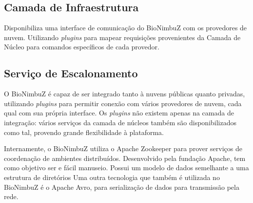 \begin{itemize}
	\end{itemize}
	
	\subsection{Camada de Infraestrutura} Disponibiliza uma interface de comunicação do BioNimbuZ com os provedores de nuvem. Utilizando \textit{plugins} para mapear requisições provenientes da Camada de Núcleo para comandos específicos de cada provedor.

\subsection{Serviço de Escalonamento}

O BioNimbuZ é capaz de ser integrado tanto à nuvens públicas quanto privadas, utilizando \textit{plugins} para permitir conexão com vários provedores de nuvem, cada qual com sua própria interface. Os \textit{plugins} não existem apenas na camada de integração: vários serviços da camada de núcleos também são disponibilizados como tal, provendo grande flexibilidade à plataforma.

Internamente, o BioNimbuZ utiliza o Apache Zookeeper\cite{Zookeeper} para prover serviços de coordenação de ambientes distribuídos. Desenvolvido pela fundação Apache\cite{Apache}, tem como objetivo ser e fácil manuseio. Possui um modelo de dados semelhante a uma estrutura de diretórios
Uma outra tecnologia que também é utilizada no BioNimbuZ é o Apache Avro\cite{Avro}, para serialização de dados para transmissão pela rede.
